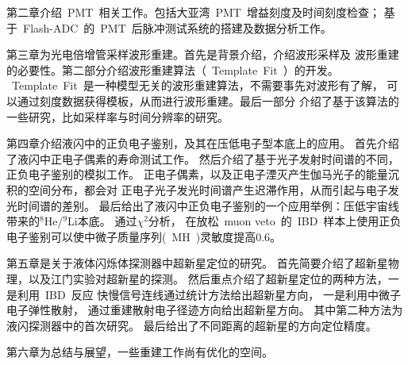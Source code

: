 第二章介绍~PMT~相关工作。包括大亚湾~PMT~增益刻度及时间刻度检查；
基于~Flash-ADC~的~PMT~后脉冲测试系统的搭建及数据分析工作。

第三章为光电倍增管采样波形重建。首先是背景介绍，介绍波形采样及
波形重建的必要性。第二部分介绍波形重建算法（~Template~Fit~）的开发。
~Template~Fit~是一种模型无关的波形重建算法，不需要事先对波形有了解，
可以通过刻度数据获得模板，从而进行波形重建。最后一部分
介绍了基于该算法的一些研究，比如采样率与时间分辨率的研究。

第四章介绍液闪中的正负电子鉴别，及其在压低电子型本底上的应用。
首先介绍了液闪中正电子偶素的寿命测试工作。
然后介绍了基于光子发射时间谱的不同，正负电子鉴别的模拟工作。
正电子偶素，以及正电子湮灭产生伽马光子的能量沉积的空间分布，都会对
正电子光子发光时间谱产生迟滞作用，从而引起与电子发光时间谱的差别。
最后给出了液闪中正负电子鉴别的一个应用举例：压低宇宙线带来的$^8$He/$^9$Li本底。
通过$\chi^2$分析，
在放松~muon veto~的~IBD~样本上使用正负电子鉴别可以使中微子质量序列(~MH~)灵敏度提高0.6。

第五章是关于液体闪烁体探测器中超新星定位的研究。
首先简要介绍了超新星物理，以及江门实验对超新星的探测。
然后重点介绍了超新星定位的两种方法，一是利用~IBD~反应
快慢信号连线通过统计方法给出超新星方向，
一是利用中微子电子弹性散射，
通过重建散射电子径迹方向给出超新星方向。
其中第二种方法为
液闪探测器中的首次研究。
最后给出了不同距离的超新星的方向定位精度。

第六章为总结与展望，一些重建工作尚有优化的空间。
